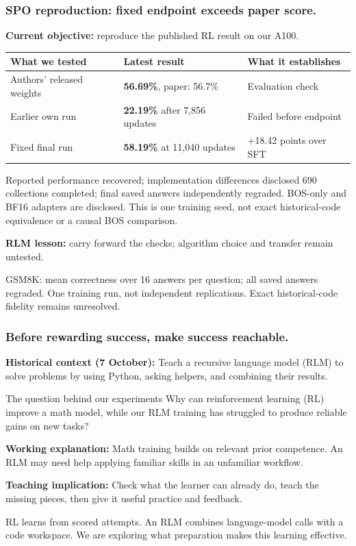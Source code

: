 \documentclass[aspectratio=169,11pt]{beamer}
\newcommand{\aside}[1]{\vfill{\footnotesize\color{Gray}#1\par}}
\begin{document}
\begin{frame}[t]
\frametitle{SPO reproduction: fixed endpoint exceeds paper score.}
\textbf{Current objective:} reproduce the published RL result on our A100.
\medskip
\begin{center}
\renewcommand{\arraystretch}{1.1}
\begin{tabular}{@{}>{\raggedright\arraybackslash}p{}>{\raggedright\arraybackslash}p{}>{\raggedright\arraybackslash}p{}@{}}
\toprule
What we tested & Latest result & What it establishes \\
\midrule
Authors' released weights & \textbf{56.69\%}, paper: 56.7\% & Evaluation check \\
Earlier own run & \textbf{22.19\%} after 7,856 updates & Failed before endpoint \\
Fixed final run & \textbf{58.19\%} at 11,040 updates & +18.42 points over SFT \\
\bottomrule
\end{tabular}
\end{center}
\begin{block}{Reported performance recovered; implementation differences disclosed}
690 collections completed; final saved answers independently regraded.
BOS-only and BF16 adapters are disclosed. This is one training seed,
not exact historical-code equivalence or a causal BOS comparison.
\end{block}
\textbf{RLM lesson:} carry forward the checks; algorithm choice and transfer remain untested.
\aside{GSM8K: mean correctness over 16 answers per question; all saved answers regraded. One training run, not independent replications. Exact historical-code fidelity remains unresolved.}
\end{frame}

\begin{frame}[t]
\frametitle{Before rewarding success, make success reachable.}
\textbf{Historical context (7 October):} Teach a recursive language model (RLM) to solve problems by using Python, asking helpers, and combining their results.
\medskip
\begin{block}{The question behind our experiments}
Why can reinforcement learning (RL) improve a math model, while our RLM training has struggled to produce reliable gains on new tasks?
\end{block}
\medskip
\textbf{Working explanation:} Math training builds on relevant prior competence. An RLM may need help applying familiar skills in an unfamiliar workflow.
\medskip

\textbf{Teaching implication:} Check what the learner can already do, teach the missing pieces, then give it useful practice and feedback.
\aside{RL learns from scored attempts. An RLM combines language-model calls with a code workspace. We are exploring what preparation makes this learning effective.}
\end{frame}
\end{document}
